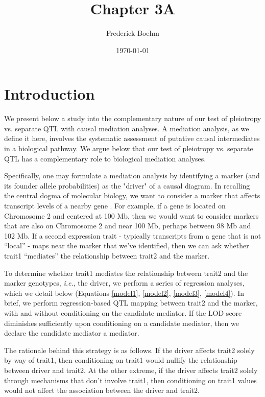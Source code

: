 \documentclass{article}
\title{Chapter 3A}
\author{Frederick Boehm}
\date{\today}
\begin{document}
\doublespacing
\maketitle
\listoftodos
\tableofcontents


\section{Introduction}


We present below a study into the complementary nature of our test of pleiotropy vs. separate QTL with causal mediation analyses. A mediation analysis, as we define it here, involves the systematic assessment of putative causal intermediates in a biological pathway. We argue below that our test of pleiotropy vs. separate QTL has a complementary role to biological mediation analyses. 

Specifically, one may formulate a mediation analysis by identifying a marker (and its founder allele probabilities) as the "driver" of a causal diagram. In recalling the central dogma of molecular biology, we want to consider a marker that affects transcript levels of a nearby gene \citep{crick1958protein}. For example, if a gene is located on Chromosome 2 and centered at 100 Mb, then we would want to consider markers that are also on Chromosome 2 and near 100 Mb, perhaps between 98 Mb and 102 Mb. If a second expression trait - typically transcripts from a gene that is not “local” - maps near the marker that we’ve identified, then we can ask whether trait1 “mediates” the relationship between trait2 and the marker. 

To determine whether trait1 mediates the relationship between trait2 and the marker genotypes, \emph{i.e.}, the driver, we perform a series of regression analyses, which we detail below (Equations \ref{model1}, \ref{model2}, \ref{model3}, \ref{model4}). In brief, we perform regression-based QTL mapping between trait2 and the marker, with and without conditioning on the candidate mediator. If the LOD score diminishes sufficiently upon conditioning on a candidate mediator, then we declare the candidate mediator a mediator. 

The rationale behind this strategy is as follows. If the driver affects trait2 solely by way of trait1, then conditioning on trait1 would nullify the relationship between driver and trait2. At the other extreme, if the driver affects trait2 solely through mechanisms that don't involve trait1, then conditioning on trait1 values would not affect the association between the driver and trait2.
\end{document}
